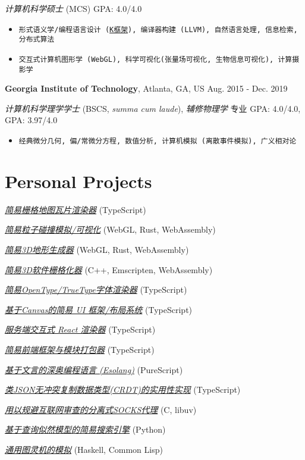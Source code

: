 \documentclass[11pt]{article}
\begin{document}
\textit{计算机科学硕士} (MCS)  \hfill GPA: 4.0/4.0 

\begin{itemize}
\item \texttt{形式语义学/编程语言设计 (\href{https://kframework.org/}{K框架}), 编译器构建 (LLVM), 自然语言处理, 信息检索, 分布式算法}
\item \texttt{交互式计算机图形学 (WebGL), 科学可视化(张量场可视化, 生物信息可视化), 计算摄影学}
\end{itemize}

\textbf{Georgia Institute of Technology}, Atlanta, GA, US \hfill Aug. 2015 - Dec. 2019

\textit{计算机科学理学学士} (BSCS, \textit{summa cum laude}), \textit{辅修物理学} \hfill 专业 GPA: 4.0/4.0, GPA: 3.97/4.0

\begin{itemize}
\item \texttt{经典微分几何, 偏/常微分方程, 数值分析, 计算机模拟 (离散事件模拟), 广义相对论}
\end{itemize}

\section*{Personal Projects}

\href{https://galmungral.github.io/mercator}{\textit{简易栅格地图瓦片渲染器}} \hfill (TypeScript)

\href{https://galmungral.github.io/particle-simulation}{\textit{简易粒子碰撞模拟/可视化}} 
\hfill (WebGL, Rust, WebAssembly)

\href{https://galmungral.github.io/terrain-generator}{\textit{简易3D地形生成器}} \hfill (WebGL, Rust, WebAssembly)

\href{https://galmungral.github.io/rasterizer?file=billboard.txt}{\textit{简易3D软件栅格化器}} \hfill (C++, Emscripten, WebAssembly)

\href{https://galmungral.github.io/text2svg}{\textit{简易OpenType/TrueType字体渲染器}} \hfill (TypeScript)

\href{https://galmungral.github.io/michelangelo}{\textit{基于Canvas的简易 UI 框架/布局系统}} \hfill (TypeScript)

\href{https://github.com/galmungral/react-teletype}{\textit{服务端交互式 React 渲染器}} \hfill (TypeScript)

\href{https://github.com/galmungral/replay}{\textit{简易前端框架与模块打包器}} \hfill (TypeScript)

\href{https://galmungral.github.io/hanbun-lang}{\textit{基于文言的深奥编程语言 (Esolang)}} \hfill (PureScript)

\href{https://github.com/galmungral/json-crdt}{\textit{类JSON无冲突复制数据类型(CRDT)的实用性实现}} \hfill (TypeScript)

\href{https://github.com/galmungral/telescope}{\textit{用以规避互联网审查的分离式SOCKS代理}} \hfill (C, libuv)

\href{https://github.com/galmungral/plato}{\textit{基于查询似然模型的简易搜索引擎}} \hfill (Python)

\href{https://github.com/galmungral/turing-machine}{\textit{通用图灵机的模拟}} \hfill (Haskell, Common Lisp)
\end{document}
